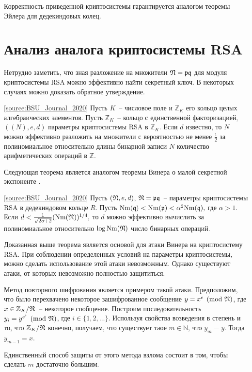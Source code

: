 \documentclass[_00_autoref.tex]{subfiles}
\begin{document}
\begin{remark}
    Корректность приведенной криптосистемы гарантируется аналогом теоремы Эйлера для дедекиндовых колец.
\end{remark}

\section{Анализ аналога криптосистемы RSA}

Нетрудно заметить, что зная разложение на множители $\mathfrak{N} = \mathfrak{p}\mathfrak{q}$ для модуля криптосистемы RSA можно эффективно найти секретный ключ.
В некоторых случаях можно доказать обратное утверждение.

\begin{theorem}\label{theorem:factor}\ref{source:BSU_Journal_2020}
    Пусть $K$~-- числовое поле и $\mathbb{Z}_K$ его кольцо целых алгебраических элементов.
    Пусть $\mathbb{Z}_K$~-- кольцо с единственной факторизацией, $((N), e, d)$ параметры криптосистемы RSA в $\mathbb{Z}_K$.
    Если $d$ известно, то $N$ можно эффективно разложить на множители с вероятностью не менее $\frac{1}{2}$ за полиномиальное относительно длины бинарной записи $N$ количество арифметических операций в $\mathbb{Z}$.
\end{theorem}

Следующая теорема является аналогом теоремы Винера о малой секретной экспоненте \cite{source:Wiener}.

\begin{theorem}\label{theorem:Wiener}\ref{source:BSU_Journal_2020}
    Пусть $(\mathfrak{N},e,d)$, $\mathfrak{N}=\mathfrak{p} \mathfrak{q}$~-- параметры криптосистемы RSA в дедекиндовом кольце $R$.
    Пусть $\textrm{Nm}(\mathfrak{q}) < \textrm{Nm}(\mathfrak{p}) < \alpha^2 \textrm{Nm}(\mathfrak{q}),$ где $\alpha > 1.$
    Если $d<\frac{1}{\sqrt{2\alpha+2}}(\textrm{Nm}(\mathfrak{N}))^{1/4},$ то $d$ можно эффективно вычислить за полиномиальное относительно $\log \textrm{Nm}(\mathfrak{N})$ число бинарных операций.
\end{theorem}

\begin{remark}
    Доказанная выше теорема является основой для атаки Винера на криптосистему RSA.
    При соблюдении определенных условий на параметры криптосистемы, можно сделать использование этой атаки невозможным.
    Однако существуют атаки, от которых невозможно полностью защититься.
    
    Метод повторного шифрования является примером такой атаки.
    Предположим, что было перехвачено некоторое зашифрованное сообщение $y = x^e \pmod{\mathfrak{N}}$, где $x \in \mathbb{Z}_{K} / \mathfrak{N}$~-- некоторое сообщение.
    Построим последовательность $y_i = y^{e^i} \pmod{\mathfrak{N}}$, где $i \in \{1, 2, \ldots\}$.
    Используя свойства возведения в степень и то, что $\mathbb{Z}_{K} / \mathfrak{N}$ конечно, получаем, что существует таое $m \in \mathbb{N}$, что $y_m = y$.
    Тогда $y_{m-1} = x$.
    
    Единственный способ защиты от этого метода взлома состоит в том, чтобы сделать $m$ достаточно большим.
\end{remark}
\end{document}
